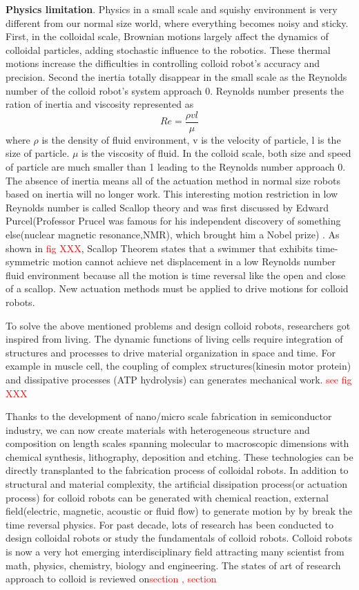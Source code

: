 \textbf{Physics limitation}. Physics in a small scale and squishy  environment is very different from our normal size world, where everything becomes noisy and sticky. First, in the colloidal scale, Brownian motions largely affect the dynamics of colloidal particles, adding stochastic influence to the robotics. These thermal motions increase the difficulties in controlling colloid robot's accuracy and precision. Second the inertia totally disappear in the small scale as the Reynolds number of the colloid robot's system approach 0.  Reynolds number presents the ration of inertia and viscosity represented as
\begin{equation}
    Re=\frac{\rho v l}{\mu}
\end{equation}
where $\rho $ is the density of fluid environment, v is the velocity of particle, l is the size of particle. $\mu$ is the  viscosity of fluid. In the colloid scale, both size and speed of particle are much smaller than 1 leading to the Reynolds number approach 0. The absence of inertia means all of the actuation method in normal size robots based on inertia will no longer work. This interesting  motion restriction in low Reynolds number is called Scallop
theory and was first discussed by Edward Purcel(Professor Prucel was famous for his independent discovery of something else(nuclear magnetic resonance,NMR), which brought him a Nobel prize) \cite{purcell1977life}. As shown in \textcolor{red}{fig XXX},  Scallop Theorem states that a swimmer that exhibits time-symmetric motion cannot achieve net displacement in a low Reynolds number fluid environment because all the motion is time reversal like the open and close of a scallop. New actuation methods must be applied to drive motions for colloid robots.

To solve the above mentioned problems and design colloid robots, researchers got inspired from living. The dynamic functions of living cells require integration of structures and processes to drive material organization in space and time. For example in muscle cell,  the coupling of complex structures(kinesin motor protein) and dissipative processes (ATP hydrolysis) can generates mechanical work. \textcolor{red}{see fig XXX}

Thanks to the development of nano/micro scale fabrication in semiconductor industry, we can now create materials with heterogeneous structure and composition on length scales spanning molecular to macroscopic dimensions with chemical synthesis, lithography, deposition and etching. These technologies can be directly transplanted to the fabrication process of colloidal robots. In addition to structural and material complexity, the artificial dissipation process(or actuation process) for colloid robots  can be generated  with chemical reaction, external field(electric, magnetic, acoustic or fluid flow) to generate motion by by break the time reversal physics. For past decade, lots of research has been conducted to design colloidal robots or study the fundamentals of colloid robots. Colloid robots is now a very hot emerging interdisciplinary field attracting many scientist from math, physics, chemistry, biology and engineering. The states of art of  research approach to colloid is reviewed on\textcolor{red}{section , section }
